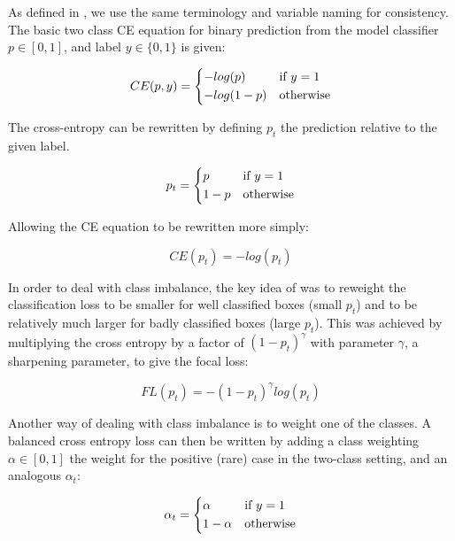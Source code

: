 As defined in \cite{Lin2017}, we use the same terminology and variable naming for consistency. The basic two class \gls{CE} equation for binary prediction from the model classifier $p \in \left[0, 1\right]$, and label $y \in \{0, 1\}$  is given:

\begin{equation}
CE(p, y) = 
  \begin{cases*}
  -log(p) & if $y = 1$\\
  -log(1-p) & otherwise\\
  \end{cases*}
\label{eq:cross_entropy}
\end{equation}


The cross-entropy can be rewritten by defining $p_t$ the prediction relative to the given label.

\begin{equation}
p_t = 
  \begin{cases*}
  p & if $y = 1$\\
  1 - p & otherwise\\
  \end{cases*}
\label{eq:class_prob}
\end{equation}

Allowing the \gls{CE} equation to be rewritten more simply:

\begin{equation}
CE(p_t) = -log(p_t)
\label{eq:short_cross_entropy}
\end{equation}


In order to deal with class imbalance, the key idea of \cite{Lin2017} was to reweight the classification loss to be smaller for well classified boxes (small $p_t$) and to be relatively much larger for badly classified boxes (large $p_t$). This was achieved by multiplying the cross entropy by a factor of $(1 - p_t)^\gamma $ with parameter $\gamma$, a sharpening parameter, to give the focal loss:

\begin{equation}
FL(p_t) = - (1 - p_t)^\gamma log(p_t)
\label{eq:focal_loss_p}
\end{equation}

Another way of dealing with class imbalance is to weight one of the classes. A balanced cross entropy loss can then be written by adding a class weighting $\alpha \in \left[0, 1\right]$ the weight for the positive (rare) case in the two-class setting, and an analogous $\alpha_t$:

\begin{equation}
\alpha_t = 
  \begin{cases*}
  \alpha & if $y = 1$\\
  1 - \alpha & otherwise\\
  \end{cases*}
\label{eq:balanced_weight}
\end{equation}

